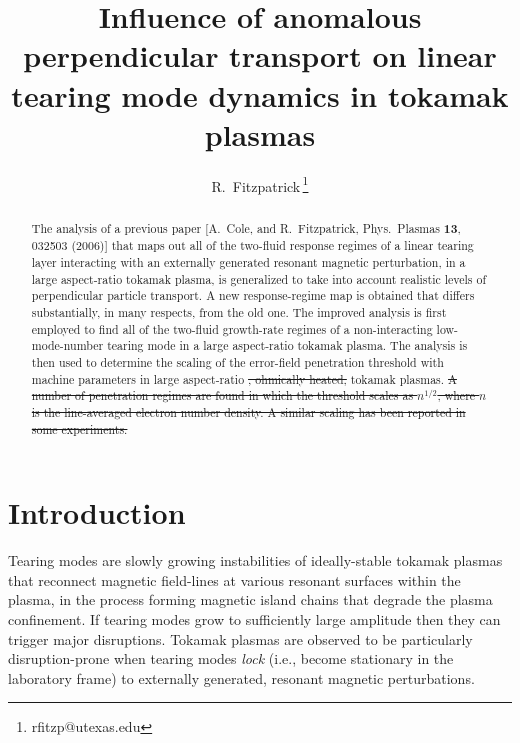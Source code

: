 \documentclass[12pt,prb,aps]{revtex4-1}
\providecommand{\DIFdel}[1]{{\protect\color{red}\sout{#1}}}                      %
\providecommand{\DIFdelbegin}{} %
\providecommand{\DIFdelend}{} %
\begin{document}
\title{Influence of anomalous perpendicular transport on linear tearing mode dynamics in tokamak plasmas}

\author{R.~Fitzpatrick\,\footnote{rfitzp@utexas.edu}}

\begin{abstract}
The analysis of a previous paper [A.~Cole, and R.~Fitzpatrick, Phys.\ Plasmas {\bf 13}, 032503 (2006)] that maps out all of the
two-fluid response regimes of a  linear tearing layer interacting with an externally generated resonant magnetic perturbation, in a large aspect-ratio tokamak plasma,  is generalized to
take into account realistic levels of perpendicular particle transport. A new response-regime map is obtained that differs substantially, in many
respects, from the old one. The improved analysis is first employed to find all of the two-fluid growth-rate regimes of a non-interacting low-mode-number tearing mode in a large aspect-ratio tokamak plasma. 
The analysis is then used to determine the scaling of the error-field penetration threshold with machine
parameters in large aspect-ratio \DIFdelbegin \DIFdel{, ohmically heated, }\DIFdelend tokamak plasmas. 
\DIFdelbegin \DIFdel{A number of penetration regimes are found in which the threshold scales as $n^{1/2}$, where $n$ is the line-averaged
electron number density. A similar scaling has been reported in some experiments. 
}\DIFdelend \end{abstract}

\maketitle

\section{Introduction}
Tearing modes are slowly growing instabilities of ideally-stable tokamak plasmas that reconnect magnetic field-lines
at various resonant surfaces within the plasma, in the process forming magnetic island chains that degrade the plasma confinement.\cite{wes}
If tearing modes grow to sufficiently large amplitude then they can trigger major disruptions.\cite{wes1}  Tokamak
plasmas are observed to be particularly disruption-prone when tearing modes {\em lock}\/ (i.e., become stationary in the
laboratory frame) to externally generated, resonant magnetic perturbations.\cite{vries}  
\end{document}
